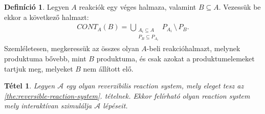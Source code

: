 \documentclass[12pt]{article}
\theoremstyle{definition}
\newtheorem{definition}{Definíció}
\theoremstyle{remark}
\theoremstyle{plain}
\newtheorem{theorem}{Tétel}
\theoremstyle{remark}
\theoremstyle{plain}
\begin{document}
    \begin{definition}
        Legyen $A$ reakciók egy véges halmaza, valamint $B \subseteq A$. Vezessük be ekkor a következő halmazt:
        \begin{align*}
            CONT_{A}(B) = \bigcup\limits_{\substack{A_{i} \subseteq A \\ P_{B} \subseteq P_{A_{i}}}} P_{A_{i}} \,\setminus\, P_{B}.
        \end{align*}
        Szemléletesen, megkeressük az összes olyan $A$-beli reakcióhalmazt, melynek produktuma bővebb, mint $B$ produktuma, és csak azokat a produktumelemeket tartjuk meg, melyeket $B$ nem állított elő.
    \end{definition}

    \begin{theorem}\label{the:simulating-a-reversible-reaction-system}
        Legyen $\mathscr{A}$ egy olyan reverzibilis \textit{reaction system}, mely eleget tesz az \ref{the:reversible-reaction-system}. tételnek. Ekkor felírható olyan \textit{reaction system} mely interaktívan szimulálja $\mathscr{A}$ lépéseit.
    \end{theorem}
\end{document}
